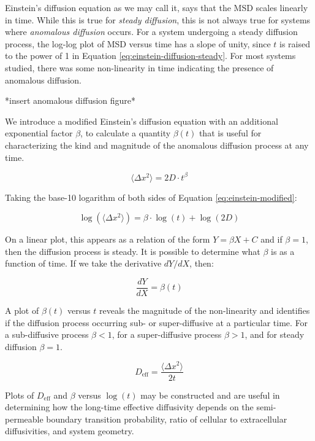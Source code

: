 	Einstein's diffusion equation as we may call it, says that the MSD scales linearly in time. While this is true for \textsl{steady diffusion}, this is not always true for systems where \textsl{anomalous diffusion} occurs. For a system undergoing a steady diffusion process, the log-log plot of MSD versus time has a slope of unity, since $ t $ is raised to the power of 1 in Equation \ref{eq:einstein-diffusion-steady}. For most systems studied, there was some non-linearity in time indicating the presence of anomalous diffusion. 
	
	*insert anomalous diffusion figure*
	
	
	We introduce a modified Einstein's diffusion equation with an additional exponential factor $ \beta $, to calculate a quantity $ \beta (t) $ that is useful for characterizing the kind and magnitude of the anomalous diffusion process at any time.
	
	\begin{equation}
	\label{eq:einstein-modified}
		\langle \Delta x^2 \rangle = 2D \cdot t^{\beta}
	\end{equation}
	
	Taking the base-10 logarithm of both sides of Equation \ref{eq:einstein-modified}:

	\begin{equation}
		\log\left( \langle \Delta x^2 \rangle \right) = \beta \cdot \log(t) + \log(2D)
	\end{equation}	
	
	On a linear plot, this appears as a relation of the form $ Y = \beta X + C $ and if $ \beta = 1 $, then the diffusion process is steady. It is possible to determine what $ \beta $ is as a function of time. If we take the derivative $ dY/dX $, then:
	
	\begin{equation}
		\dfrac{dY}{dX} = \beta (t)
	\end{equation}
	
	A plot of $ \beta (t) $ versus $ t $ reveals the magnitude of the non-linearity and identifies if the diffusion process occurring sub- or super-diffusive at a particular time. For a sub-diffusive process $ \beta < 1 $, for a super-diffusive process $ \beta > 1 $, and for steady diffusion $ \beta = 1 $.
	
	\begin{equation}
		D_\textrm{eff} = \dfrac{\langle \Delta x^2 \rangle}{2t}
	\end{equation}
	
	Plots of $ D_\textrm{eff} $ and $ \beta $ versus $ \log (t) $ may be constructed and are useful in determining how the long-time effective diffusivity depends on the semi-permeable boundary transition probability, ratio of cellular to extracellular diffusivities, and system geometry.

